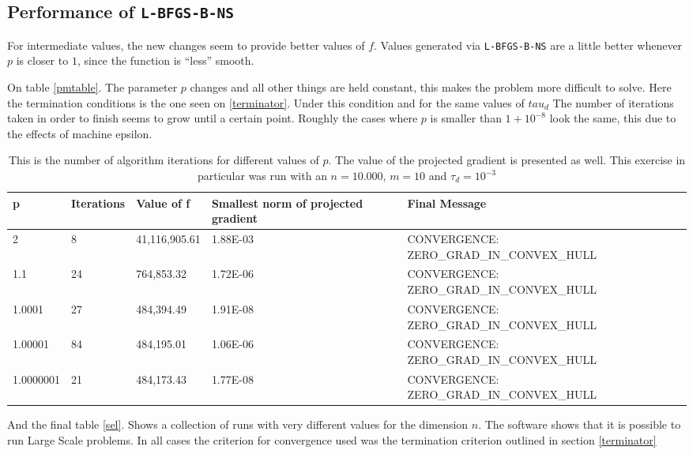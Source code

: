 \subsection{Performance of \texttt{L-BFGS-B-NS}}

For intermediate values, the new changes seem to provide better values of $f$. Values generated via \texttt{L-BFGS-B-NS} are a little better whenever $p$ is closer to $1$, since the function is ``less'' smooth.

On table \eqref{pmtable}. The parameter $p$ changes and all other things are held constant, this makes the problem more difficult to solve. Here the termination conditions is the one seen on \eqref{terminator}. Under this condition and for the same values of $tau_d$ The number of iterations taken in order to finish seems to grow until a certain point. Roughly the cases where $p$ is smaller than $1+10^{-8}$ look the same, this due to the effects of machine epsilon.

\begin{center}
  \begin{table}
    \label{pmtable}
    \begin{tabular}{|l|l|l|p{3.5cm}|p{6cm}|}
      \hline
      p & Iterations & Value of f & Smallest norm of projected gradient & Final Message\\ \hline
      2 & 8 & 41,116,905.61 & 1.88E-03 & CONVERGENCE: ZERO\_GRAD\_IN\_CONVEX\_HULL \\
      1.1 & 24 & 764,853.32 & 1.72E-06 & CONVERGENCE: ZERO\_GRAD\_IN\_CONVEX\_HULL \\ 
      1.0001 & 27 & 484,394.49 & 1.91E-08 & CONVERGENCE: ZERO\_GRAD\_IN\_CONVEX\_HULL \\ 
      1.00001 & 84 & 484,195.01 & 1.06E-06 & CONVERGENCE: ZERO\_GRAD\_IN\_CONVEX\_HULL \\ 
      1.0000001 & 21 & 484,173.43 & 1.77E-08 & CONVERGENCE: ZERO\_GRAD\_IN\_CONVEX\_HULL \\ \hline
    \end{tabular}
    \caption[Number of algorithm iterations changing $p$]{This is the number of algorithm iterations for different values of $p$. The value of the projected gradient is presented as well. This exercise in particular was run with an $n = 10.000$, $m = 10$ and $\tau_d = 10^{-3}$}
  \end{table}
\end{center}

And the final table \eqref{sel}. Shows a collection of runs with very different values for the dimension $n$. The software shows that it is possible to run Large Scale problems. In all cases the criterion for convergence used was the termination criterion outlined in section \eqref{terminator}


